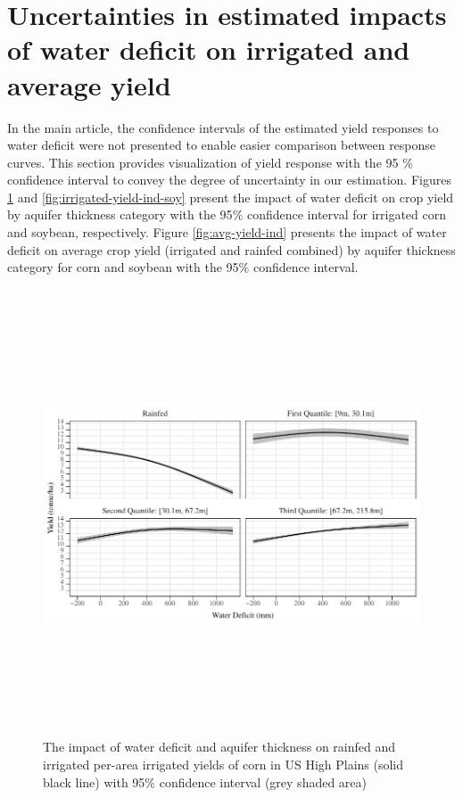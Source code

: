 \documentclass[
]{article}
\begin{document}
\hypertarget{reg-conf}{%
\section{Uncertainties in estimated impacts of water deficit on irrigated and average yield}\label{reg-conf}}

\setcounter{figure}{0}
\renewcommand{\thefigure}{A.\arabic{figure}}

In the main article, the confidence intervals of the estimated yield responses to water deficit were not presented to enable easier comparison between response curves. This section provides visualization of yield response with the 95 \(\%\) confidence interval to convey the degree of uncertainty in our estimation. Figures \ref{fig:irrigated-yield-ind-corn} and \ref{fig:irrigated-yield-ind-soy} present the impact of water deficit on crop yield by aquifer thickness category with the 95\(\%\) confidence interval for irrigated corn and soybean, respectively. Figure \ref{fig:avg-yield-ind} presents the impact of water deficit on average crop yield (irrigated and rainfed combined) by aquifer thickness category for corn and soybean with the 95\(\%\) confidence interval.

\begin{figure}[H]

{\centering \includegraphics[width=6in,height=500px,]{../../Figures/g_yield_with_conf_corn} 

}

\caption{The impact of water deficit and aquifer thickness on rainfed and irrigated per-area irrigated yields of corn in US High Plains (solid black line) with 95\% confidence interval (grey shaded area)}\label{fig:irrigated-yield-ind-corn}
\end{figure}
\end{document}
